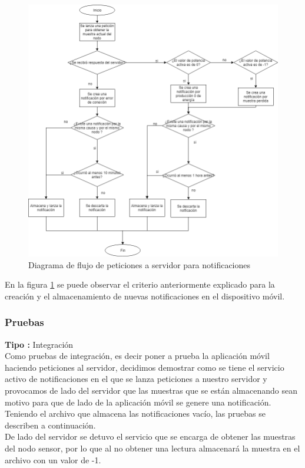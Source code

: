 \begin{figure}[H]
	\centering
	\includegraphics[scale=.45]{Capitulo5/images/df_notificacionServidor.png}
	\caption{Diagrama de flujo de peticiones a servidor para notificaciones}	
	\label{fig:Diagrama de flujo de peticiones a servidor para notificaciones}
\end{figure} 

En la figura \ref{fig:Diagrama de flujo de peticiones a servidor para notificaciones} se puede observar el criterio anteriormente explicado para la creación y el almacenamiento de nuevas notificaciones en el dispositivo móvil.

\subsubsection{Pruebas}
\textbf{Tipo :} Integración \\ \newline
Como pruebas de integración, es decir poner a prueba la aplicación móvil haciendo peticiones al servidor, decidimos demostrar como se tiene el servicio activo de notificaciones en el que se lanza peticiones a nuestro servidor y provocamos de lado del servidor que las muestras que se están almacenando sean motivo para que de lado de la aplicación móvil se genere una notificación.
\\ \newline
Teniendo el archivo que almacena las notificaciones vacío, las pruebas se describen a continuación.
\\ \newline
De lado del servidor se detuvo el servicio que se encarga de obtener las muestras del nodo sensor, por lo que al no obtener una lectura almacenará la muestra en el archivo con un valor de -1.

